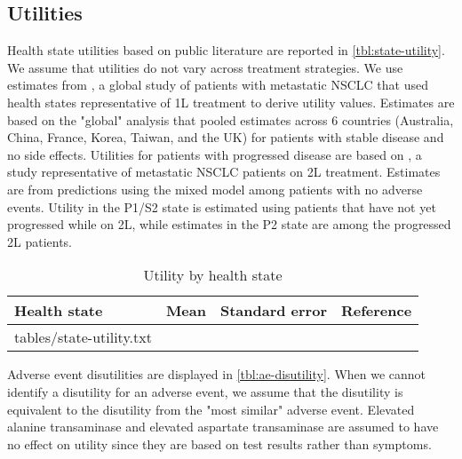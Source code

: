 \documentclass[11pt,final,fleqn]{article}\usepackage[]{graphicx}\usepackage[]{color}
\makeatletter
\theoremstyle{plain}
\newcommand*\ExpandableInput[1]{\@@input#1 }
\makeatother
\begin{document}
{\FloatBarrier

\subsection{Utilities}\label{subsec:data-utility}
Health state utilities based on public literature are reported in \autoref{tbl:state-utility}. We assume that utilities do not vary across treatment strategies. We use estimates from \citet{nafees2017health}, a global study of patients with metastatic NSCLC that used health states representative of 1L treatment to derive utility values. Estimates are based on the "global" analysis that pooled estimates across 6 countries (Australia, China, France, Korea, Taiwan, and the UK) for patients with stable disease and no side effects. Utilities for patients with progressed disease are based on \citet{nafees2008health}, a study representative of metastatic NSCLC patients on 2L treatment. Estimates are from predictions using the mixed model among patients with no adverse events. Utility in the P1/S2 state is estimated using patients that have not yet progressed while on 2L, while estimates in the P2 state are among the progressed 2L patients. 

\begin{table}[!ht]
\begin{center}
\begin{threeparttable}
\caption{Utility by health state} \label{tbl:state-utility}
\begin{tabularx}{\textwidth}{@{\extracolsep{\fill}}lrrl}
\hline
\multicolumn{1}{l}{Health state} & \multicolumn{1}{l}{Mean} & \multicolumn{1}{l}{Standard error} & \multicolumn{1}{l}{Reference} \\
\hline
\ExpandableInput{tables/state-utility.txt}
\hline
\end{tabularx}
\scriptsize
\end{threeparttable}
\end{center}
\end{table}

Adverse event disutilities are displayed in \autoref{tbl:ae-disutility}. When we cannot identify a disutility for an adverse event, we assume that the disutility is equivalent to the disutility from the "most similar" adverse event. Elevated alanine transaminase and elevated aspartate transaminase are assumed to have no effect on utility since they are based on test results rather than symptoms.      

}
\end{document}
